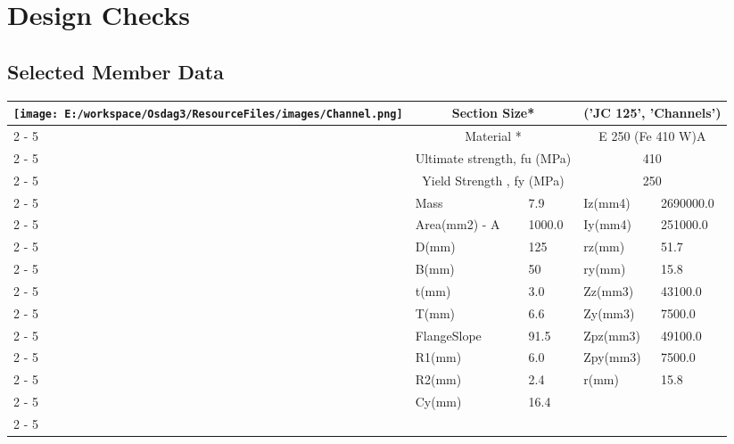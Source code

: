 \documentclass{article}%
\begin{document}
%
%
\newpage%
\section{Design Checks}%
\label{sec:DesignChecks}%
\subsection{Selected Member Data}%
\label{subsec:SelectedMemberData}%
\renewcommand{\arraystretch}{1.2}%
\begin{longtable}{|p{5cm}|p{2cm}|p{2cm}|p{2cm}|p{5cm}|}%
\hline%
\hline%
\multirow{14}{*}{\texttt{[image: E:/workspace/Osdag3/ResourceFiles/images/Channel.png]}}&\multicolumn{2}{|c|}{Section Size*}&\multicolumn{2}{|c|}{('JC 125', 'Channels')}\\%
\cline{2%
-%
5}%
&\multicolumn{2}{|c|}{Material *}&\multicolumn{2}{|c|}{E 250 (Fe 410 W)A}\\%
\cline{2%
-%
5}%
&\multicolumn{2}{|c|}{Ultimate strength, fu (MPa)}&\multicolumn{2}{|c|}{410}\\%
\cline{2%
-%
5}%
&\multicolumn{2}{|c|}{Yield Strength , fy (MPa)}&\multicolumn{2}{|c|}{250}\\%
\cline{2%
-%
5}%
&Mass&7.9&Iz(mm4)&2690000.0\\%
\cline{2%
-%
5}%
&Area(mm2) {-} A&1000.0&Iy(mm4)&251000.0\\%
\cline{2%
-%
5}%
&D(mm)&125&rz(mm)&51.7\\%
\cline{2%
-%
5}%
&B(mm)&50&ry(mm)&15.8\\%
\cline{2%
-%
5}%
&t(mm)&3.0&Zz(mm3)&43100.0\\%
\cline{2%
-%
5}%
&T(mm)&6.6&Zy(mm3)&7500.0\\%
\cline{2%
-%
5}%
&FlangeSlope&91.5&Zpz(mm3)&49100.0\\%
\cline{2%
-%
5}%
&R1(mm)&6.0&Zpy(mm3)&7500.0\\%
\cline{2%
-%
5}%
&R2(mm)&2.4&r(mm)&15.8\\%
\cline{2%
-%
5}%
&Cy(mm)&16.4&&\\%
\cline{2%
-%
5}%
\hline%
\end{longtable}

%
\newpage%
\end{document}
